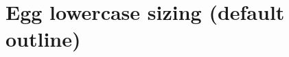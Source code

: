 \documentclass{jlreq}
\begin{document}
\section*{Egg lowercase sizing (default outline)}

\KKSeggsuite
\KKSeggshowcase
\end{document}
